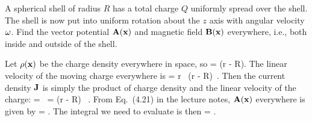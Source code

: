 \begin{statement}{}
	A spherical shell of radius $R$ has a total charge $Q$ uniformly spread over the shell.  The shell is now put into uniform rotation about the $z$ axis with angular velocity $\omega$.  Find the vector potential $\vb{A}(\vb{x})$ and magnetic field $\vb{B}(\vb{x})$ everywhere, i.e., both inside and outside of the shell.
\end{statement}

\begin{solution}
	Let $\rho(\vb{x})$ be the charge density everywhere in space, so
	\beq
		\rhox =   \delta(r - R).
	\eeq
	The linear velocity of the moving charge everywhere is
	\beq
		\vvx = \omg r \, \delta(r - R)\, \phh.
	\eeq
	Then the current density $\vb{J}$ is simply the product of charge density and the linear velocity of the charge:
	\beq
		\vJx = \rhox \, \vvx
		=   \delta(r - R) \, \phh.
	\eeq
	From Eq.~(4.21) in the lecture notes, $\vb{A}(\vb{x})$ everywhere is given by
	\beq
		\vAx =  \int {} \dcxp.
	\eeq
	The integral we need to evaluate is then
	\beq
		\vAx =   \int {} \dcxp.
	\eeq
	

\end{solution}
